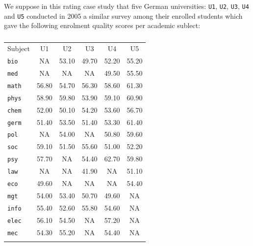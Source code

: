 We suppose in this rating case study that five German universities: \texttt{U1}, \texttt{U2}, \texttt{U3}, \texttt{U4} and \texttt{U5} conducted in 2005 a similar survey among their enrolled students which gave the following enrolment quality scores per academic sublect:
\begin{table}[ht]
\caption{}
\label{tab:14.1}       %
\begin{center}
    \begin{tabular}{l|c|c|c|c|c}
      \svhline\noalign{\smallskip}
      Subject & U1 & U2 & U3 & U4 & U5 \\
      \noalign{\smallskip}\hline\noalign{\smallskip}
      \texttt{bio}   & NA     & 53.10 & 49.70 & 52.20 & 55.20\\
      \texttt{med}   & NA     & NA    & NA    & 49.50 & 55.50\\
      \noalign{\smallskip}\hline\noalign{\smallskip}
      \texttt{math}  & 56.80  & 54.70 & 56.30 & 58.60 & 61.30\\
      \texttt{phys}  & 58.90  & 59.80 & 53.90 & 59.10 & 60.90\\
      \texttt{chem}  & 52.00  & 50.10 & 54.20 & 53.60 & 56.70\\
      \noalign{\smallskip}\hline\noalign{\smallskip}
      \texttt{germ}  & 51.40  & 53.50 & 51.40 & 53.30 & 61.40\\
      \texttt{pol}   & NA     & 54.00 & NA    & 50.80 & 59.60\\
      \texttt{soc}   & 59.10  & 51.50 & 55.60 & 51.00 & 52.20\\
      \texttt{psy}   & 57.70  & NA    & 54.40 & 62.70 & 59.80\\
      \noalign{\smallskip}\hline\noalign{\smallskip}
      \texttt{law}   & NA     & NA    & 41.90 & NA    & 51.10\\
      \texttt{eco}   & 49.60  & NA    & NA    & NA    & 54.40\\
      \texttt{mgt}   & 54.00  & 53.40 & 50.70 & 49.60 & NA   \\
      \noalign{\smallskip}\hline\noalign{\smallskip}
      \texttt{info}  & 55.40  & 52.60 & 55.80 & 54.60 & NA   \\ 
      \texttt{elec}  & 56.10  & 54.50 & NA    & 57.20 & NA   \\
      \texttt{mec}   & 54.30  & 55.20 & NA    & 54.40 & NA   \\
      \noalign{\smallskip}\hline
    \end{tabular}
\end{center}
\end{table}

